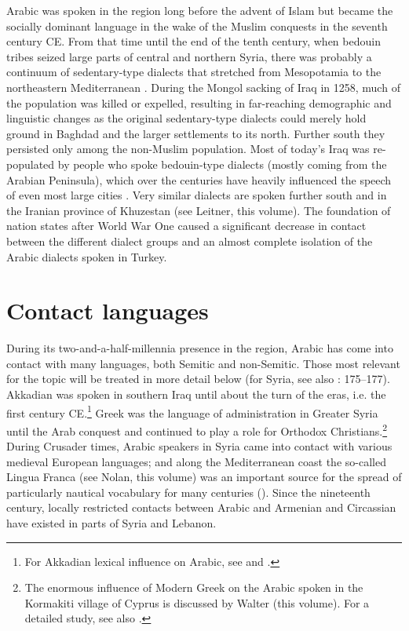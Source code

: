 \documentclass[output=paper]{langsci/langscibook}
\begin{document}
Arabic was spoken in the region long before the advent of Islam \citep[95]{Donner1981} but became the socially dominant language in the wake of the Muslim conquests in the seventh century CE. From that time until the end of the tenth century, when bedouin tribes seized large parts of central and northern Syria, there was probably a continuum of sedentary-type dialects that stretched from Mesopotamia to the northeastern Mediterranean \citep[291]{Procházka2018Fertile}. During the Mongol sacking of Iraq in 1258, much of the population was killed or expelled, resulting in far-reaching demographic and linguistic changes as the original sedentary-type dialects could merely hold ground in Baghdad and the larger settlements to its north. Further south they persisted only among the non-Muslim population. Most of today’s Iraq was re-populated by people who spoke bedouin-type dialects (mostly coming from the Arabian Peninsula), which over the centuries have heavily influenced the speech of even most large cities \citep{Holes2007}. Very similar dialects are spoken further south and in the Iranian province of Khuzestan (see Leitner, this volume). The foundation of nation states after World War One caused a significant decrease in contact between the different dialect groups and an almost complete isolation of the Arabic dialects spoken in Turkey.

\section{Contact languages} 

During its two-and-a-half-millennia presence in the region, Arabic has come into contact with many languages, both Semitic and non-Semitic. Those most relevant for the topic will be treated in more detail below (for Syria, see also \citealt{Barbot1961}: 175--177). Akkadian was spoken in southern Iraq until about the turn of the eras, i.e. the first century CE.\footnote{For Akkadian lexical influence on Arabic, see \citet{Holes2002} and \citet{Krebernik2008}.} Greek was the language of administration in Greater Syria until the Arab conquest \citep[185--187]{Magidow2013} and continued to play a role for Orthodox Christians.\footnote{The enormous influence of Modern Greek on the Arabic spoken in the Kormakiti village of Cyprus is discussed by Walter (this volume). For a detailed study, see also \citet{Borg1985}.} During Crusader times, Arabic speakers in Syria came into contact with various medieval European languages; and along the Mediterranean coast the so-called Lingua Franca (see Nolan, this volume) was an important source for the spread of particularly nautical vocabulary for many centuries (\citealt{KahaneKahaneTietze1958}). Since the nineteenth century, locally restricted contacts between Arabic and Armenian and Circassian have existed in parts of Syria and Lebanon. 
\end{document}
